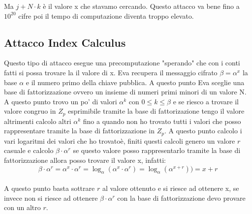 \documentclass[10pt,a4paper]{article}
\begin{document}
Ma $j+N\cdot k$ è il valore x che stavamo cercando. Questo attacco va bene fino a $10^20$ cifre poi il tempo di computazione diventa troppo elevato.

\subsection{Attacco Index Calculus}
Questo tipo di attacco esegue una precomputazione "sperando" che con i conti fatti si possa trovare la il valore di x. Eva recupera il messaggio cifrato $\beta=\alpha^x$ la base $\alpha$ e il numero primo della chiave pubblica. A questo punto Eva sceglie una base di fattorizzazione ovvero un insieme di numeri primi minori di un valore N. A questo punto trovo un po' di valori $\alpha^k$ con $0\leq k \leq \beta$ e se riesco a trovare il valore congruo in $Z_p$ esprimibile tramite la base di fattorizazione tengo il valore altrimenti calcolo altri $\alpha^k$ fino a quando non ho trovato tutti i valori che posso rappresentare tramite la base di fattorizzazione in $Z_p$. A questo punto calcolo i vari logaritmi dei valori che ho trovatoè, finiti questi calcoli genero un valore $r$ casuale e calcolo $\beta\cdot\alpha^r$ se questo valore posso rappresentarlo tramite la base di fattorizzazione allora posso trovare il valore x, infatti:
$$ \beta \cdot \alpha^r =
 \alpha^x \cdot \alpha^r = 
 \log_{\alpha}(\alpha^x \cdot \alpha^r) =
  \log_{\alpha}(\alpha^{x+r})) = x+r$$\\

A questo punto basta sottrare $r$ al valore ottenuto e si riesce ad ottenere x, se invece non si riesce ad ottenere $\beta\cdot\alpha^r$ con la base di fattorizzazione devo provare con un altro $r$.
\end{document}
